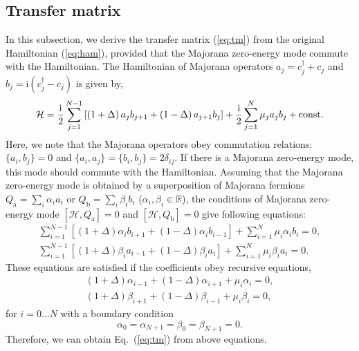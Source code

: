 \documentclass[%
superscriptaddress,
preprint,
amsmath,amssymb,
]{revtex4-1}
\newcommand{\mrm}{\mathrm}
\newcommand{\mcl}{\mathcal}
\newcommand{\mbb}{\mathbb}
\newcommand{\im}{\mrm{i}}
\begin{document}
\subsection{Transfer matrix}
In this subsection, we derive the transfer matrix (\ref{eq:tm}) from the original Hamiltonian (\ref{eq:ham}), provided that the Majorana zero-energy mode  commute with the Hamiltonian.
The Hamiltonian of Majorana operators $a_j=c_j^\dag+c_j$ and $b_j=\im (c_j^\dag-c_j)$ is given by,
\begin{equation}
\small
\label{eq:MajHam}
\mcl{H}=\frac{\im}{2}\sum_{j=1}^{N-1} \left[\left(1+\Delta\right)a_jb_{j+1}+\left(1-\Delta\right)a_{j+1}b_{j}\right]+\frac{\im}{2}\sum_{j=1}^{N} \mu_j a_jb_j + \mrm{const.}
\end{equation}
Here, we note that the Majorana operators obey commutation relations: $\{a_i,b_j\}=0$ and $\{a_i,a_j\}=\{b_i,b_j\}=2\delta_{ij}$.
If there is a Majorana zero-energy mode, this mode should commute with the Hamiltonian.
Assuming that the Majorana zero-energy mode is obtained by a superposition of Majorana fermions $Q_{\mrm{a}}=\sum_i\alpha_i a_i$ or $Q_{\mrm{b}}=\sum_i\beta_i b_i$ ($\alpha_i,\beta_i\in \mbb{R}$), the conditions of Majorana zero-energy mode $[\mcl{H},Q_{\mrm{a}}]=0$ and $[\mcl{H},Q_{\mrm{b}}]=0$ give following equations:
\begin{eqnarray}
\sum_{i=1}^{N-1}\left[(1+\Delta)\alpha_i b_{i+1}+(1-\Delta)\alpha_i b_{i-1}\right]+\sum_{i=1}^N\mu_i\alpha_i b_i=0,\\
\sum_{i=1}^{N-1}\left[(1+\Delta)\beta_i a_{i-1}+(1-\Delta)\beta_i a_{i}\right]+\sum_{i=1}^N\mu_i\beta_i a_i=0.
\end{eqnarray}
These equations are satisfied if the coefficients obey recursive equations,
\begin{eqnarray}
(1+\Delta)\alpha_{i-1}+(1-\Delta)\alpha_{i+1}+\mu_i\alpha_i=0,\\
(1+\Delta)\beta_{i+1}+(1-\Delta)\beta_{i-1}+\mu_i\beta_i=0,
\end{eqnarray}
for $i=0\dots N$ with a boundary condition
\begin{equation}
\alpha_0=\alpha_{N+1}=\beta_0=\beta_{N+1}=0.
\end{equation}
Therefore, we can obtain Eq.~(\ref{eq:tm}) from above equations.  
\end{document}
